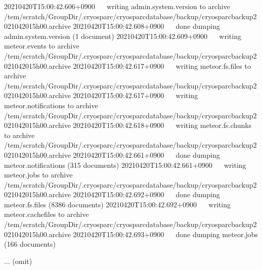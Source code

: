 \documentclass[a4paper,11pt,english]{sphinxmanual}
\begin{document}
\begin{sphinxVerbatim}[commandchars=\\\{\}]
2021\PYGZhy{}04\PYGZhy{}20T15:00:42.606+0900    writing admin.system.version to archive \PYGZsq{}/tem/scratch/\PYGZlt{}GroupDir\PYGZgt{}/.cryosparc/cryosparc\PYGZus{}database/backup/cryosparc\PYGZus{}backup\PYGZus{}2021\PYGZus{}04\PYGZus{}20\PYGZus{}15h00.archive\PYGZsq{}
2021\PYGZhy{}04\PYGZhy{}20T15:00:42.608+0900    done dumping admin.system.version (1 document)
2021\PYGZhy{}04\PYGZhy{}20T15:00:42.609+0900    writing meteor.events to archive \PYGZsq{}/tem/scratch/\PYGZlt{}GroupDir\PYGZgt{}/.cryosparc/cryosparc\PYGZus{}database/backup/cryosparc\PYGZus{}backup\PYGZus{}2021\PYGZus{}04\PYGZus{}20\PYGZus{}15h00.archive\PYGZsq{}
2021\PYGZhy{}04\PYGZhy{}20T15:00:42.617+0900    writing meteor.fs.files to archive \PYGZsq{}/tem/scratch/\PYGZlt{}GroupDir\PYGZgt{}/.cryosparc/cryosparc\PYGZus{}database/backup/cryosparc\PYGZus{}backup\PYGZus{}2021\PYGZus{}04\PYGZus{}20\PYGZus{}15h00.archive\PYGZsq{}
2021\PYGZhy{}04\PYGZhy{}20T15:00:42.617+0900    writing meteor.notifications to archive \PYGZsq{}/tem/scratch/\PYGZlt{}GroupDir\PYGZgt{}/.cryosparc/cryosparc\PYGZus{}database/backup/cryosparc\PYGZus{}backup\PYGZus{}2021\PYGZus{}04\PYGZus{}20\PYGZus{}15h00.archive\PYGZsq{}
2021\PYGZhy{}04\PYGZhy{}20T15:00:42.618+0900    writing meteor.fs.chunks to archive \PYGZsq{}/tem/scratch/\PYGZlt{}GroupDir\PYGZgt{}/.cryosparc/cryosparc\PYGZus{}database/backup/cryosparc\PYGZus{}backup\PYGZus{}2021\PYGZus{}04\PYGZus{}20\PYGZus{}15h00.archive\PYGZsq{}
2021\PYGZhy{}04\PYGZhy{}20T15:00:42.661+0900    done dumping meteor.notifications (315 documents)
2021\PYGZhy{}04\PYGZhy{}20T15:00:42.661+0900    writing meteor.jobs to archive \PYGZsq{}/tem/scratch/\PYGZlt{}GroupDir\PYGZgt{}/.cryosparc/cryosparc\PYGZus{}database/backup/cryosparc\PYGZus{}backup\PYGZus{}2021\PYGZus{}04\PYGZus{}20\PYGZus{}15h00.archive\PYGZsq{}
2021\PYGZhy{}04\PYGZhy{}20T15:00:42.692+0900    done dumping meteor.fs.files (8386 documents)
2021\PYGZhy{}04\PYGZhy{}20T15:00:42.692+0900    writing meteor.cache\PYGZus{}files to archive \PYGZsq{}/tem/scratch/\PYGZlt{}GroupDir\PYGZgt{}/.cryosparc/cryosparc\PYGZus{}database/backup/cryosparc\PYGZus{}backup\PYGZus{}2021\PYGZus{}04\PYGZus{}20\PYGZus{}15h00.archive\PYGZsq{}
2021\PYGZhy{}04\PYGZhy{}20T15:00:42.693+0900    done dumping meteor.jobs (166 documents)

... (omit)


\end{sphinxVerbatim}
\end{document}
